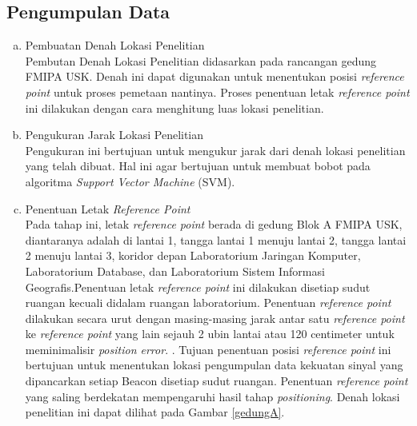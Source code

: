\subsection{Pengumpulan Data}
\begin{enumerate}[a.]
	\itemsep0em
	\item Pembuatan Denah Lokasi Penelitian
	      \\
	      Pembutan Denah Lokasi Penelitian didasarkan pada rancangan gedung FMIPA USK. Denah ini dapat digunakan untuk menentukan posisi \textit{reference point} untuk proses pemetaan nantinya. Proses penentuan letak \textit{reference point} ini dilakukan dengan cara menghitung luas lokasi penelitian.

	\item Pengukuran Jarak Lokasi Penelitian
	      \\
	      Pengukuran ini bertujuan untuk mengukur jarak dari denah lokasi penelitian yang telah dibuat. Hal ini agar bertujuan untuk membuat bobot pada algoritma \textit{Support Vector Machine} (SVM).

	\item Penentuan Letak \textit{Reference Point}
	      \\
	      Pada tahap ini, letak \textit{reference point} berada di gedung Blok A FMIPA USK, diantaranya adalah di lantai 1, tangga lantai 1 menuju lantai 2, tangga lantai 2 menuju lantai 3, koridor depan Laboratorium Jaringan Komputer, Laboratorium Database, dan Laboratorium Sistem Informasi Geografis.Penentuan letak \textit{reference point} ini dilakukan disetiap sudut ruangan kecuali didalam ruangan laboratorium. Penentuan \textit{reference point} dilakukan secara urut dengan masing-masing jarak antar satu \textit{reference point} ke \textit{reference point} yang lain sejauh 2 ubin lantai atau 120 centimeter untuk meminimalisir \textit{position error}. \citep{Lee2019} \citep{Bahl2000}. Tujuan penentuan posisi \textit{reference point} ini bertujuan untuk menentukan lokasi pengumpulan data kekuatan sinyal yang dipancarkan setiap Beacon disetiap sudut ruangan. Penentuan \textit{reference point} yang saling berdekatan mempengaruhi hasil tahap \textit{positioning}. Denah lokasi penelitian ini dapat dilihat pada Gambar \ref{gedungA}.


\end{enumerate}
